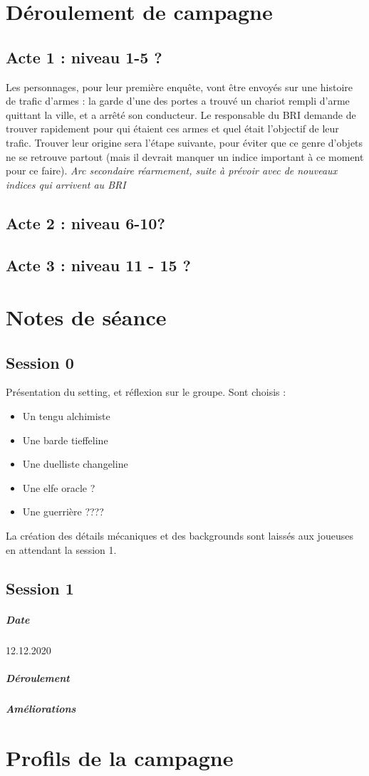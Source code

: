 \documentclass[10pt,a4paper]{book}
\begin{document}
\chapter{Déroulement de campagne}
\section{Acte 1 : niveau 1-5 ?}
Les personnages, pour leur première enquête, vont être envoyés sur une histoire de trafic d'armes : la garde d'une des portes a trouvé un chariot rempli d'arme quittant la ville, et a arrêté son conducteur. Le responsable du BRI demande de trouver rapidement pour qui étaient ces armes et quel était l'objectif de leur trafic. Trouver leur origine sera l'étape suivante, pour éviter que ce genre d'objets ne se retrouve partout (mais il devrait manquer un indice important à ce moment pour ce faire). 
\emph{Arc secondaire réarmement, suite à prévoir avec de nouveaux indices qui arrivent au BRI}
\section{Acte 2 : niveau 6-10?}

\section{Acte 3 : niveau 11 - 15 ?}
\chapter{Notes de séance}
\section{Session 0}
Présentation du setting, et réflexion sur le groupe. Sont choisis :
\begin{itemize}
\item Un tengu alchimiste
\item Une barde tieffeline
\item Une duelliste changeline
\item Une elfe oracle ?
\item Une guerrière ????
\end{itemize}
La création des détails mécaniques et des backgrounds sont laissés aux joueuses en attendant la session 1.
\section{Session 1}
\paragraph{Date}12.12.2020
\paragraph{Déroulement}
\paragraph{Améliorations}
\chapter{Profils de la campagne}
\end{document}
